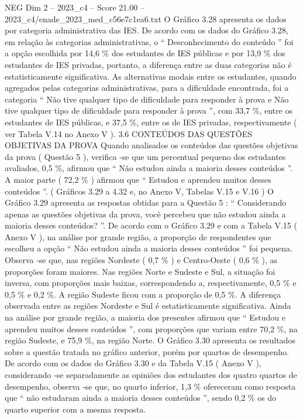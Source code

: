 \begin{textsample}{NEG Dim 2 – 2023\_c4 – Score 21.00 – 2023\_c4/enade\_2023\_med\_c56e7c1ea6.txt}
O Gráfico 3.28 apresenta os dados por categoria administrativa das IES.
De acordo com os dados do Gráfico 3.28, em relação às categorias administrativas, o “ Desconhecimento do conteúdo ” foi a opção escolhida por 14,6 \% dos estudantes de IES públicas e por 13,9 \% dos estudantes de IES privadas, portanto, a diferença entre as duas categorias não é estatisticamente significativa.
As alternativas modais entre os estudantes, quando agregados pelas categorias administrativas, para a dificuldade encontrada, foi a categoria “ Não tive qualquer tipo de dificuldade para responder à prova e Não tive qualquer tipo de dificuldade para responder à prova ”, com 33,7 \%, entre os estudantes de IES públicas, e 37,5 \%, entre os de IES privadas, respectivamente ( ver Tabela V.14 no Anexo V ). 3.6 CONTEÚDOS DAS QUESTÕES OBJETIVAS DA PROVA Quando analisados os conteúdos das questões objetivas da prova ( Questão 5 ), verifica -se que um percentual pequeno dos estudantes avaliados, 0,5 \%, afirmou que “ Não estudou ainda a maioria desses conteúdos ”.
A maior parte ( 72,2 \% ) afirmou que “ Estudou e aprendeu muitos desses conteúdos ”. ( Gráficos 3.29 a 4.32 e, no Anexo V, Tabelas V.15 e V.16 ) O Gráfico 3.29 apresenta as respostas obtidas para a Questão 5 : “ Considerando apenas as questões objetivas da prova, você percebeu que não estudou ainda a maioria desses conteúdos? ”.
De acordo com o Gráfico 3.29 e com a Tabela V.15 ( Anexo V ), na análise por grande região, a proporção de respondentes que escolheu a opção “ Não estudou ainda a maioria desses conteúdos ” foi pequena.
Observa -se que, nas regiões Nordeste ( 0,7 \% ) e Centro-Oeste ( 0,6 \% ), as proporções foram maiores.
Nas regiões Norte e Sudeste e Sul, a situação foi inversa, com proporções mais baixas, correspondendo a, respectivamente, 0,5 \% e 0,5 \% e 0,2 \%.
A região Sudeste ficou com a proporção de 0,5 \%.
A diferença observada entre as regiões Nordeste e Sul é estatisticamente significativa.
Ainda na análise por grande região, a maioria dos presentes afirmou que “ Estudou e aprendeu muitos desses conteúdos ”, com proporções que variam entre 70,2 \%, na região Sudeste, e 75,9 \%, na região Norte.
O Gráfico 3.30 apresenta os resultados sobre a questão tratada no gráfico anterior, porém por quartos de desempenho.
De acordo com os dados do Gráfico 3.30 e da Tabela V.15 ( Anexo V ), considerando -se separadamente as opiniões dos estudantes dos quatro quartos de desempenho, observa -se que, no quarto inferior, 1,3 \% ofereceram como resposta que “ não estudaram ainda a maioria desses conteúdos ”, sendo 0,2 \% os do quarto superior com a mesma resposta.

\end{textsample}
